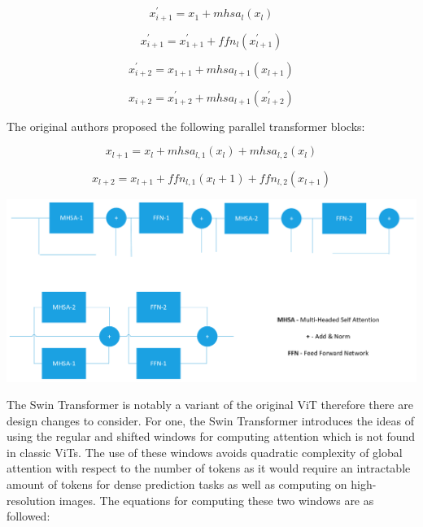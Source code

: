 \documentclass[10pt,twocolumn,letterpaper]{article}
\begin{document}
\begin{equation}
x^{'}_{i+1} = x_1 + mhsa_l(x_l)
\end{equation}

\begin{equation}
x^{'}_{i+1} = x^{'}_{1+1} + ffn_l(x^{'}_{l+1})
\end{equation}

\begin{equation}
x^{'}_{i+2} = x_{1+1} + mhsa_{l+1}(x_{l+1})
\end{equation}

\begin{equation}
x_{i+2} = x^{'}_{1+2} + mhsa_{l+1}(x^{'}_{l+2})
\end{equation}

The original authors proposed the following parallel transformer blocks:

\begin{equation}
x_{l+1} = x_{l} + mhsa_{l,1}(x_l) + mhsa_{l,2}(x_l)
\end{equation}

\begin{equation}
x_{l+2} = x_{l+1} + ffn_{l,1}(x_l+1) + ffn_{l,2}(x_{l+1})
\end{equation}

\includegraphics[width=0.8\linewidth]{docs/latex/images/brandon/MHSA-Original.png}

The Swin Transformer is notably a variant of the original ViT therefore there are design changes to consider. For one, the Swin Transformer introduces the ideas of using the regular and shifted windows for computing attention which is not found in classic ViTs. The use of these windows avoids quadratic complexity of global attention with respect to the number of tokens as it would require an intractable amount of tokens for dense prediction tasks as well as computing on high-resolution images. The equations for computing these two windows are as followed:
\end{document}
